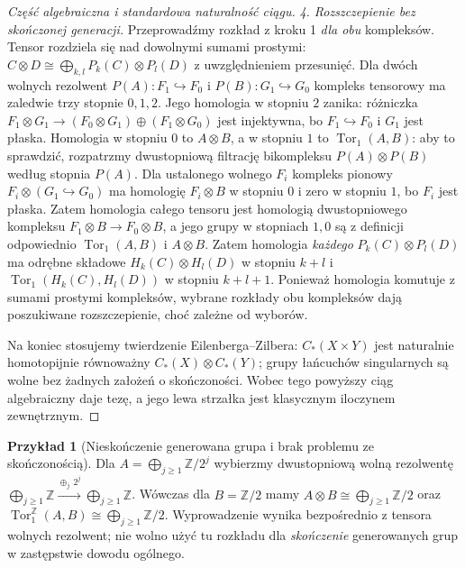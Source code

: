 \documentclass[11pt,a4paper,oneside]{report}
\newcommand{\Z}{\mathbb{Z}}
\theoremstyle{plain}
\theoremstyle{definition}
\newtheorem{przyklad}[twierdzenie]{Przykład}
\theoremstyle{remark}
\begin{document}
\begin{proof}[Część algebraiczna i standardowa naturalność ciągu]
\emph{4. Rozszczepienie bez skończonej generacji.}
Przeprowadźmy rozkład z kroku 1 \emph{dla obu} kompleksów.
Tensor rozdziela się nad dowolnymi sumami prostymi:
$C\otimes D\cong\bigoplus_{k,l}P_k(C)\otimes P_l(D)$
z uwzględnieniem przesunięć.
Dla dwóch wolnych rezolwent
$P(A):F_1\hookrightarrow F_0$ i
$P(B):G_1\hookrightarrow G_0$ kompleks tensorowy ma
zaledwie trzy stopnie $0,1,2$. Jego homologia w stopniu $2$
zanika: różniczka
$F_1\otimes G_1\to(F_0\otimes G_1)\oplus(F_1\otimes G_0)$
jest injektywna, bo $F_1\hookrightarrow F_0$ i $G_1$
jest płaska. Homologia w stopniu $0$ to $A\otimes B$,
a w stopniu $1$ to $\operatorname{Tor}_1(A,B)$:
aby to sprawdzić, rozpatrzmy dwustopniową filtrację
bikompleksu $P(A)\otimes P(B)$ według stopnia $P(A)$.
Dla ustalonego wolnego $F_i$ kompleks pionowy
$F_i\otimes(G_1\hookrightarrow G_0)$ ma homologię
$F_i\otimes B$ w stopniu $0$ i zero w stopniu $1$,
bo $F_i$ jest płaska. Zatem homologia całego tensoru
jest homologią dwustopniowego kompleksu
$F_1\otimes B\to F_0\otimes B$, a jego grupy
w stopniach $1,0$ są z definicji odpowiednio
$\operatorname{Tor}_1(A,B)$ i $A\otimes B$. Zatem homologia \emph{każdego}
$P_k(C)\otimes P_l(D)$ ma odrębne składowe
$H_k(C)\otimes H_l(D)$ w stopniu $k+l$ i
$\operatorname{Tor}_1(H_k(C),H_l(D))$ w stopniu $k+l+1$.
Ponieważ homologia komutuje z sumami prostymi kompleksów,
wybrane rozkłady obu kompleksów dają poszukiwane
rozszczepienie, choć zależne od wyborów.

Na koniec stosujemy twierdzenie Eilenberga--Zilbera:
$C_*(X\times Y)$ jest naturalnie homotopijnie równoważny
$C_*(X)\otimes C_*(Y)$; grupy łańcuchów singularnych są wolne
bez żadnych założeń o skończoności. Wobec tego powyższy
ciąg algebraiczny daje tezę, a jego lewa strzałka jest
klasycznym iloczynem zewnętrznym.
\end{proof}
\begin{przyklad}[Nieskończenie generowana grupa i brak problemu ze skończonością]
Dla $A=\bigoplus_{j\ge1}\Z/2^j$ wybierzmy dwustopniową wolną
rezolwentę
$\bigoplus_{j\ge1}\Z\xrightarrow{\oplus_j\,2^j}
 \bigoplus_{j\ge1}\Z$.
Wówczas dla $B=\Z/2$ mamy
$A\otimes B\cong\bigoplus_{j\ge1}\Z/2$ oraz
$\operatorname{Tor}^{\Z}_1(A,B)\cong\bigoplus_{j\ge1}\Z/2$.
Wyprowadzenie wynika bezpośrednio z tensora wolnych rezolwent;
nie wolno użyć tu rozkładu dla \emph{skończenie} generowanych
grup w zastępstwie dowodu ogólnego.
\end{przyklad}
\end{document}
